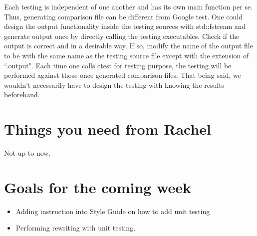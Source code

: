 \documentclass{article}
\begin{document}
Each testing is independent of one another and has its own main function per se. Thus, generating comparison file can be different from Google test. One could design the output functionality inside the testing sources with std::fstream and generate output once by directly calling the testing executables. Check if the output is correct and in a desirable way. If so, modify the name of the output file to be with the same name as the testing source file except with the extension of ``.output". Each time one calls ctest for testing purpose, the testing will be performed against those once generated comparison files. That being said, we wouldn't necessarily have to design the testing with knowing the results beforehand.

\section{Things you need from Rachel}
Not up to now.

\section{Goals for the coming week}
\begin{itemize}
	\item Adding instruction into Style Guide on how to add unit testing
	\item Performing rewriting with unit testing.
\end{itemize}





%
%
%

\end{document}
